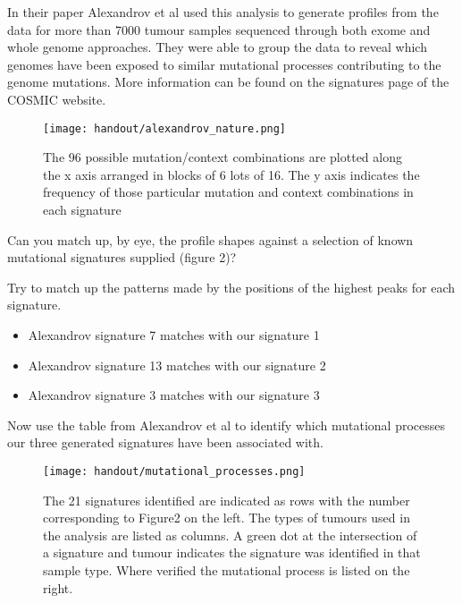 In their paper Alexandrov et al used this analysis to generate profiles from the data for
more than 7000 tumour samples sequenced through both exome and whole genome approaches.
They were able to group the data to reveal which genomes have been exposed to similar
mutational processes contributing to the genome mutations. More information can be found on the signatures page of the COSMIC website.

\begin{figure}[H]
\centering
\texttt{[image: handout/alexandrov\_nature.png]}
\caption{The 96 possible mutation/context combinations are plotted along the x axis
arranged in blocks of 6 lots of 16. The y axis indicates the frequency
of those particular mutation and context combinations in each signature}
\label{Figure 2. 21 signature patterns identified from the analysis of more
than 7000 different tumours from Alexandrov et al. Nature 2013.}
\end{figure}

\begin{questions}
Can you match up, by eye, the profile shapes against a selection of known
mutational signatures supplied (figure 2)?

Try to match up the patterns made by the positions of the highest peaks for each signature.
\end{questions}

\begin{answer}
\begin{itemize}
\item Alexandrov signature 7 matches with our signature 1
\item Alexandrov signature 13 matches with our signature 2
\item Alexandrov signature 3 matches with our signature 3
\end{itemize}
\end{answer}

Now use the table from Alexandrov et al to identify which mutational
processes our three generated signatures have been associated with.

\begin{figure}[H]
\centering
\texttt{[image: handout/mutational\_processes.png]}
\caption{The 21 signatures identified are indicated as rows with the number corresponding to Figure2 on the left. The types of tumours used in the analysis are listed as columns. A green dot at the intersection of a signature and tumour indicates the signature was identified in that sample type. Where verified the mutational process is listed on the right.}
\label{Figure 3 Table indicating the probable association of the identified signatures with mutational processes and the origin site of the cancer samples from Alexandrov et al. Nature 2013.}
\end{figure}

